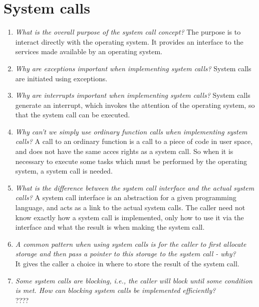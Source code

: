 \documentclass[a4paper]{article}
\begin{document}
\section{System calls}
\begin{enumerate}
  \item \textit{What is the overall purpose of the system call concept? }
    The purpose is to interact directly with the operating system. It provides an interface to the services made available by an operating system.
  \item \textit{Why are exceptions important when implementing system calls?}
    System calls are initiated using exceptions. 
  \item \textit{Why are interrupts important when implementing system calls?}
    System calls generate an interrupt, which invokes the attention of the operating system, so that the system call can be executed.
  \item \textit{Why can't we simply use ordinary function calls when implementing system calls?}
    A call to an ordinary function is a call to a piece of code in user space, and does not have the same acces rights as a system call. So when it is necessary to execute some tasks which must be performed by the operating system, a system call is needed.
  \item \textit{What is the difference between the system call interface and the actual system calls?}
    A system call interface is an abstraction for a given programming language, and acts as a link to the actual system calls. The caller need not know exactly how a system call is implemented, only how to use it via the interface and what the result is when making the system call.
  \item \textit{A common pattern when using system calls is for the caller to first allocate storage and then pass a pointer to this storage to the system call - why? } \\ 
    It gives the caller a choice in where to store the result of the system call.
  \item \textit{Some system calls are blocking, i.e., the caller will block until some condition is met. How can blocking system calls be implemented efficiently?} \\
    {\color{red} ????}
  
\end{enumerate}
\end{document}
